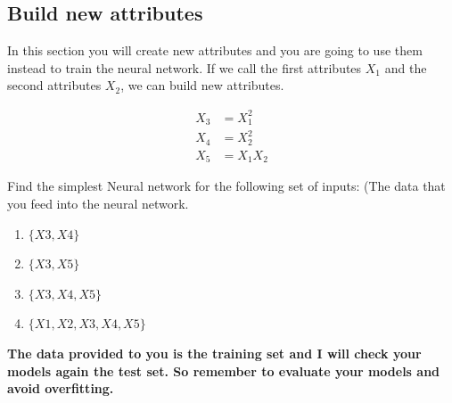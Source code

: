 \documentclass[12pt,letterpaper]{article}
\begin{document}
\subsection*{Build new attributes}
In this section you will create new attributes and you are going to use them instead to train the neural network. If we call the first attributes $X_1$ and the second attributes $X_2$, we can build new attributes.

\begin{align*}
X_3 &= X_1^2 \\ 
X_4 &= X_2^2 \\
X_5 &= X_1 X_2
\end{align*} 

Find the simplest Neural network for the following set of inputs: (The data that you feed into the neural network.

\begin{enumerate}
\item $\{X3, X4\}$
\item $\{X3, X5\}$
\item $\{X3, X4, X5\}$
\item $\{X1, X2, X3, X4, X5\}$
\end{enumerate}


\textbf{The data provided to you is the training set and I will check your models again the test set. So remember to evaluate your models and avoid overfitting.} 
\end{document}
